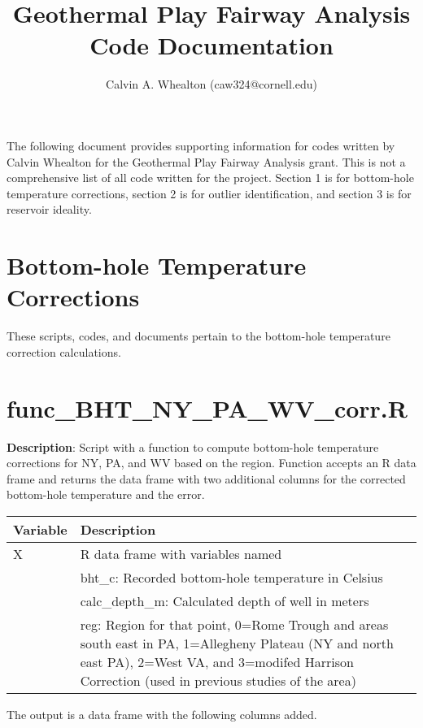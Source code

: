 \documentclass[12pt,a4paper]{article}
\author{Calvin A. Whealton (caw324@cornell.edu)}
\title{Geothermal Play Fairway Analysis Code Documentation}
\begin{document}
\maketitle
The following document provides supporting information for codes written by Calvin Whealton for the Geothermal Play Fairway Analysis grant. This is not a comprehensive list of all code written for the project. Section 1 is for bottom-hole temperature corrections, section 2 is for outlier identification, and section 3 is for reservoir ideality. 

\section*{Bottom-hole Temperature Corrections}

These scripts, codes, and documents pertain to the bottom-hole temperature correction calculations.

\section*{\textsf{func\_BHT\_NY\_PA\_WV\_corr.R}}

\textbf{Description}: Script with a function to compute bottom-hole temperature corrections for NY, PA, and WV based on the region. Function accepts an R data frame and returns the data frame with two additional columns for the corrected bottom-hole temperature and the error.

\begin{table}[H]
\begin{tabular} {p{2cm} p{11cm}}
\hline
\textbf{Variable} & \textbf{Description}\\
\hline
\textsf{X} 			 & R data frame with variables named\\
 & \textsf{bht\_c}: Recorded bottom-hole temperature in Celsius\\
 & \textsf{calc\_depth\_m}: Calculated depth of well in meters\\
 & \textsf{reg}:  Region for that point, 0=Rome Trough and areas south east in PA, 1=Allegheny Plateau (NY and north east PA), 2=West VA, and 3=modifed Harrison Correction (used in previous studies of the area)\\
\hline
\end{tabular} 
\end{table}

The output is a data frame with the following columns added.
\end{document}
